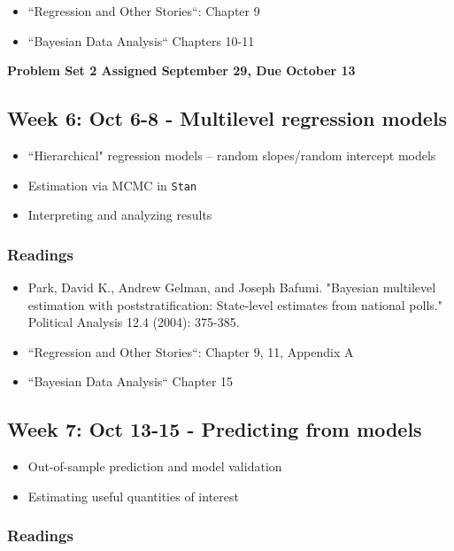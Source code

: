\documentclass[11pt, article, oneside]{memoir}
\theoremstyle{Assumption}
\begin{document}
\begin{itemize}
\item ``Regression and Other Stories``: Chapter 9
\item ``Bayesian Data Analysis`` Chapters 10-11
\end{itemize}

\textbf{Problem Set 2 Assigned September 29, Due October 13}

\subsection{Week 6: Oct 6-8 - Multilevel regression models}

\begin{itemize}
\item ``Hierarchical" regression models -- random slopes/random intercept models
\item Estimation via MCMC in \texttt{Stan}
\item Interpreting and analyzing results
\end{itemize}

\subsubsection*{Readings}

\begin{itemize}
\item Park, David K., Andrew Gelman, and Joseph Bafumi. "Bayesian multilevel estimation with poststratification: State-level estimates from national polls." Political Analysis 12.4 (2004): 375-385.
\item ``Regression and Other Stories``: Chapter 9, 11, Appendix A
\item ``Bayesian Data Analysis`` Chapter 15
\end{itemize}

\subsection{Week 7: Oct 13-15 - Predicting from models}

\begin{itemize}
\item Out-of-sample prediction and model validation
\item Estimating useful quantities of interest
\end{itemize}

\subsubsection*{Readings}
\end{document}
